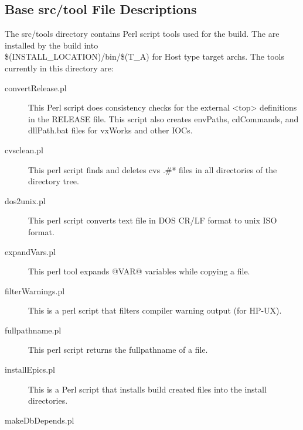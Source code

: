 \subsection{Base src/tool File Descriptions}

The src/tools directory contains Perl script tools used for the build. The are installed by the build into \\
\$(INSTALL\_LOCATION)/bin/\$(T\_A) for Host type target archs. The tools currently in this directory are:

\begin{description}

\item[convertRelease.pl]

This Perl script does consistency checks for the external \textless{}top\textgreater{} definitions in the RELEASE file. This script also creates envPaths, cdCommands, and dllPath.bat files for vxWorks and other IOCs.

\item[cvsclean.pl]

This perl script finds and deletes cvs .\#* files in all directories of the directory tree.

\item[dos2unix.pl]

This perl script converts text file in DOS CR/LF format to unix ISO format.

\item[expandVars.pl]

This perl tool expands @VAR@ variables while copying a file.

\item[filterWarnings.pl]

This is a perl script that filters compiler warning output (for HP-UX).

\item[fullpathname.pl]

This perl script returns the fullpathname of a file.

\item[installEpics.pl]

This is a Perl script that installs build created files into the install directories.

\item[makeDbDepends.pl]


\end{description}
